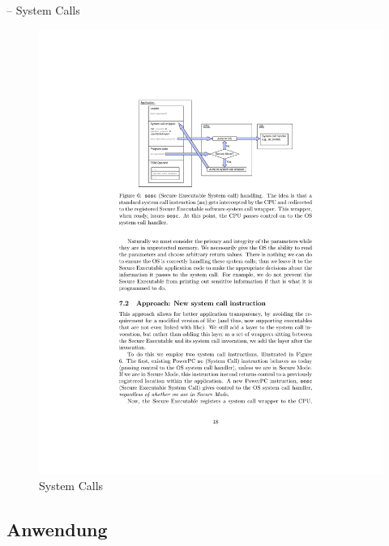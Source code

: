 \documentclass[fleqn,11pt,aspectratio=43,table]{beamer}
\newlength\foo
\begin{document}
\begin{frame}{\insertsectionhead -- System Calls}
	\vspace{-0.5em}
\begin{figure}
	\centering
	\includegraphics[width=\columnwidth]{sesc}
	\caption*{\footnotesize System Calls\cite{boivie2013secureblue++:big}}
\end{figure}
\end{frame}

\subsection{Anwendung}
\end{document}
